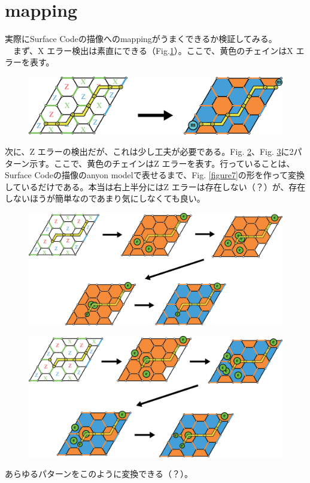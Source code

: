 \documentclass[a4paper,9pt]{ltjsarticle}
\begin{document}
\section{mapping}{
    実際にSurface Codeの描像へのmappingがうまくできるか検証してみる。\\
    　まず、X エラー検出は素直にできる（Fig.\ref{figure8}）。ここで、黄色のチェインはX エラーを表す。

    \begin{figure}[h]
        \centering
        \includegraphics[scale=0.18]{figure/figure8.eps}
        \vspace{10pt}\caption{ }
        \label{figure8}
    \end{figure}

    次に、Z エラーの検出だが、これは少し工夫が必要である。Fig. \ref{figure9}、Fig. \ref{figure10}に2パターン示す。ここで、黄色のチェインはZ エラーを表す。行っていることは、Surface Codeの描像のanyon modelで表せるまで、Fig. \ref{figure7}の形を作って変換しているだけである。本当は右上半分にはZ エラーは存在しない（？）が、存在しないほうが簡単なのであまり気にしなくても良い。

    \begin{figure}[h]
        \centering
        \includegraphics[scale=0.20]{figure/figure9.eps}
        \vspace{10pt}\caption{ }
        \label{figure9}
    \end{figure}
    \begin{figure}[h]
        \centering
        \includegraphics[scale=0.20]{figure/figure10.eps}
        \vspace{10pt}\caption{ }
        \label{figure10}
    \end{figure}

    あらゆるパターンをこのように変換できる（？）。
}
\end{document}
